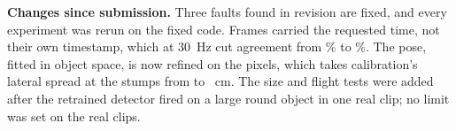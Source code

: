 \textbf{Changes since submission.} Three faults found in revision are fixed, and every experiment was rerun
on the fixed code. Frames carried the requested time, not their own timestamp, which at 30~Hz cut agreement
from \FpsThirtyFixedAtSixtyAgree\% to \FpsThirtySubmittedAtSixtyAgree\%. The pose, fitted in object space, is
now refined on the pixels, which takes calibration's lateral spread at the stumps from \CalUnrefSdY{} to
\CalAppSdY~cm. The size and flight tests were added after the retrained detector fired on a large round
object in one real clip; no limit was set on the real clips.

